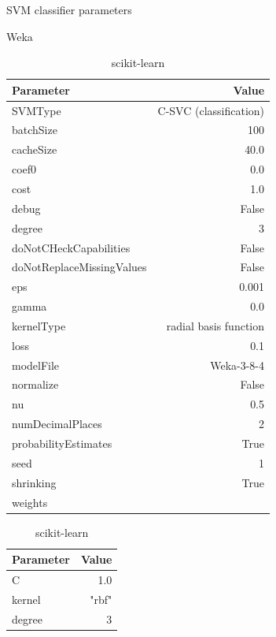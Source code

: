 \begin{table}[H]
    \footnotesize
    \centering
    \caption{SVM classifier parameters} \label{tab:svm_param}
    \begin{subtable}[t]{.5\linewidth}
        \caption{Weka \cite{noauthor_libsvm_nodate}}
        \centering
        \begin{tabular}{lr}\toprule
            Parameter & Value \\\midrule
            SVMType & C-SVC (classification) \\
            batchSize & 100 \\
            cacheSize & 40.0 \\
            coef0 & 0.0 \\
            cost & 1.0 \\
            debug & False \\
            degree & 3 \\
            doNotCHeckCapabilities & False \\
            doNotReplaceMissingValues & False \\
            eps & 0.001 \\
            gamma & 0.0 \\
            kernelType & radial basis function\\
            loss & 0.1 \\
            modelFile & Weka-3-8-4 \\
            normalize & False \\
            nu & 0.5 \\
            numDecimalPlaces & 2 \\
            probabilityEstimates & True \\
            seed & 1 \\
            shrinking & True \\
            weights & \\\bottomrule
        \end{tabular}
    \end{subtable}%
    \begin{subtable}[t]{.5\linewidth}
        \caption{scikit-learn \cite{noauthor_sklearnsvmsvc_nodate}}
        \centering
        \begin{tabular}{lr}\toprule
            Parameter & Value \\\midrule
            C & 1.0 \\
            kernel & "rbf" \\
            degree & 3 \\

\end{tabular}
\end{subtable}
\end{table}
